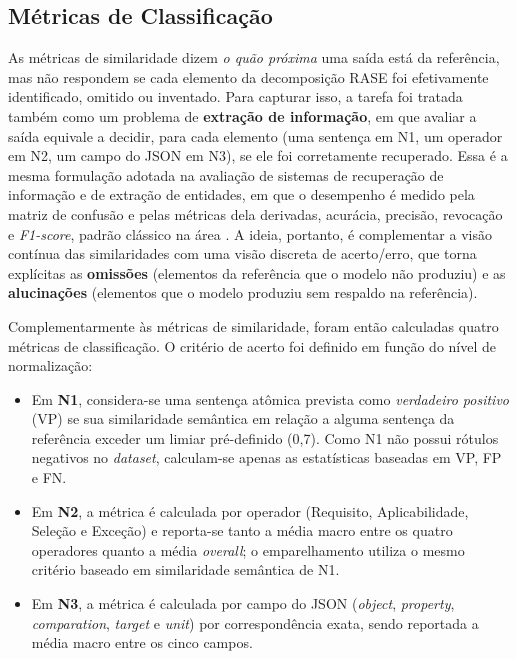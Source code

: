\subsection{Métricas de Classificação}
\label{sec:metricas_classificacao}

As métricas de similaridade dizem \textit{o quão próxima} uma saída está da referência, mas não respondem se cada elemento da decomposição RASE foi efetivamente identificado, omitido ou inventado. Para capturar isso, a tarefa foi tratada também como um problema de \textbf{extração de informação}, em que avaliar a saída equivale a decidir, para cada elemento (uma sentença em N1, um operador em N2, um campo do JSON em N3), se ele foi corretamente recuperado. Essa é a mesma formulação adotada na avaliação de sistemas de recuperação de informação e de extração de entidades, em que o desempenho é medido pela matriz de confusão e pelas métricas dela derivadas, acurácia, precisão, revocação e \textit{F1-score}, padrão clássico na área \cite{manning2008}. A ideia, portanto, é complementar a visão contínua das similaridades com uma visão discreta de acerto/erro, que torna explícitas as \textbf{omissões} (elementos da referência que o modelo não produziu) e as \textbf{alucinações} (elementos que o modelo produziu sem respaldo na referência).

Complementarmente às métricas de similaridade, foram então calculadas quatro métricas de classificação. O critério de acerto foi definido em função do nível de normalização:

\begin{itemize}
    \item Em \textbf{N1}, considera-se uma sentença atômica prevista como \textit{verdadeiro positivo} (VP) se sua similaridade semântica em relação a alguma sentença da referência exceder um limiar pré-definido (0{,}7). Como N1 não possui rótulos negativos no \textit{dataset}, calculam-se apenas as estatísticas baseadas em VP, FP e FN.
    \item Em \textbf{N2}, a métrica é calculada por operador (Requisito, Aplicabilidade, Seleção e Exceção) e reporta-se tanto a média macro entre os quatro operadores quanto a média \textit{overall}; o emparelhamento utiliza o mesmo critério baseado em similaridade semântica de N1.
    \item Em \textbf{N3}, a métrica é calculada por campo do JSON (\textit{object}, \textit{property}, \textit{comparation}, \textit{target} e \textit{unit}) por correspondência exata, sendo reportada a média macro entre os cinco campos.
\end{itemize}


